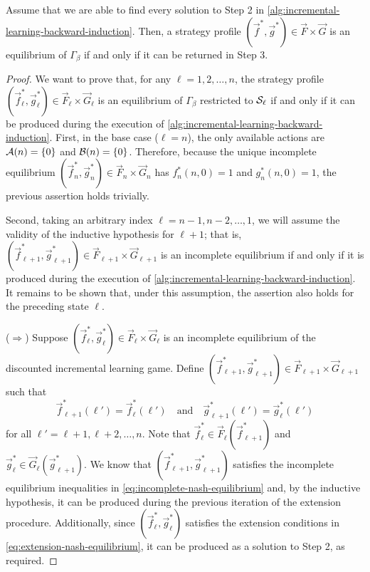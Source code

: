     \begin{theorem}  \label{thm:backward-induction-verification}
        Assume that we are able to find every solution to Step 2 in \autoref{alg:incremental-learning-backward-induction}.
        Then, a strategy profile $(\vec{f}^*, \vec{g}^*) \in \vec{F} \times \vec{G}$ is an equilibrium of $\Gamma_\beta$ if and only if it can be returned in Step 3.
    \end{theorem}

    \begin{proof}
        We want to prove that, for any $\ell = 1, 2, \ldots, n$, the strategy profile $(\vec{f}^*_\ell, \vec{g}^*_\ell) \in \vec{F}_\ell \times \vec{G}_\ell$ is an equilibrium of $\Gamma_\beta$ restricted to $\mathcal{S}_\ell$ if and only if it can be produced during the execution of \autoref{alg:incremental-learning-backward-induction}.
        First, in the base case ($\ell = n$), the only available actions are $\mathcal{A}(n) = \{0\}$ and $\mathcal{B}(n) = \{0\}$.
        Therefore, because the unique incomplete equilibrium $(\vec{f}^*_n, \vec{g}^*_n) \in \vec{F}_n \times \vec{G}_n$ has $f^*_n(n, 0) = 1$ and $g^*_n(n, 0) = 1$, the previous assertion holds trivially.

        Second, taking an arbitrary index $\ell = n - 1, n - 2, \ldots, 1$, we will assume the validity of the inductive hypothesis for $\ell + 1$; that is, $(\vec{f}^*_{\ell + 1}, \vec{g}^*_{\ell + 1}) \in \vec{F}_{\ell + 1} \times \vec{G}_{\ell + 1}$ is an incomplete equilibrium if and only if it is produced during the execution of \autoref{alg:incremental-learning-backward-induction}.
        It remains to be shown that, under this assumption, the assertion also holds for the preceding state $\ell$.

        ($\Longrightarrow$)
        Suppose $(\vec{f}^*_\ell, \vec{g}^*_\ell) \in \vec{F}_\ell \times \vec{G}_\ell$ is an incomplete equilibrium of the discounted incremental learning game.
        Define $(\vec{f}^*_{\ell + 1}, \vec{g}^*_{\ell + 1}) \in \vec{F}_{\ell + 1} \times \vec{G}_{\ell + 1}$ such that
        \[
            \vec{f}^*_{\ell + 1}(\ell')
                = \vec{f}^*_\ell(\ell')
            \quad\text{and}\quad
            \vec{g}^*_{\ell + 1}(\ell')
                = \vec{g}^*_\ell(\ell')
        \]
        for all $\ell' = \ell + 1, \ell + 2, \ldots, n$.
        Note that $\vec{f}^*_\ell \in \vec{F}_\ell(\vec{f}^*_{\ell + 1})$ and $\vec{g}^*_\ell \in \vec{G}_\ell(\vec{g}^*_{\ell + 1})$.
        We know that $(\vec{f}^*_{\ell + 1}, \vec{g}^*_{\ell + 1})$ satisfies the incomplete equilibrium inequalities in \eqref{eq:incomplete-nash-equilibrium} and, by the inductive hypothesis, it can be produced during the previous iteration of the extension procedure.
        Additionally, since $(\vec{f}^*_\ell, \vec{g}^*_\ell)$ satisfies the extension conditions in \eqref{eq:extension-nash-equilibrium}, it can be produced as a solution to Step 2, as required.


\end{proof}
